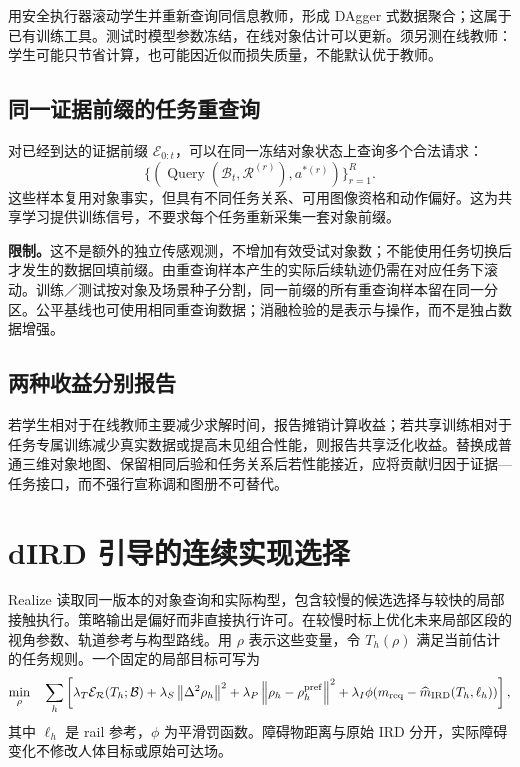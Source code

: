 \documentclass[UTF8,11pt,a4paper,fontset=fandol]{ctexart}
\numberwithin{equation}{section}
\theoremstyle{definition}
\newcommand{\norm}[1]{\left\lVert#1\right\rVert}
\begin{document}
用安全执行器滚动学生并重新查询同信息教师，形成 DAgger 式数据聚合\cite{dagger}；这属于已有训练工具。测试时模型参数冻结，在线对象估计可以更新。须另测在线教师：学生可能只节省计算，也可能因近似而损失质量，不能默认优于教师。

\subsection{同一证据前缀的任务重查询}
对已经到达的证据前缀 $\mathcal E_{0:t}$，可以在同一冻结对象状态上查询多个合法请求：
\begin{equation}
\bigl\{(\operatorname{Query}(\mathcal B_t,\mathcal R^{(r)}),a^{*(r)})\bigr\}_{r=1}^{R}.
\label{eq:requerytraining}
\end{equation}
这些样本复用对象事实，但具有不同任务关系、可用图像资格和动作偏好。这为共享学习提供训练信号，不要求每个任务重新采集一套对象前缀。

\textbf{限制。}这不是额外的独立传感观测，不增加有效受试对象数；不能使用任务切换后才发生的数据回填前缀。由重查询样本产生的实际后续轨迹仍需在对应任务下滚动。训练／测试按对象及场景种子分割，同一前缀的所有重查询样本留在同一分区。公平基线也可使用相同重查询数据；消融检验的是表示与操作，而不是独占数据增强。

\subsection{两种收益分别报告}
若学生相对于在线教师主要减少求解时间，报告摊销计算收益；若共享训练相对于任务专属训练减少真实数据或提高未见组合性能，则报告共享泛化收益。替换成普通三维对象地图、保留相同后验和任务关系后若性能接近，应将贡献归因于证据—任务接口，而不强行宣称调和图册不可替代。

\section{dIRD 引导的连续实现选择}
\label{sec:dird}
Realize 读取同一版本的对象查询和实际构型，包含较慢的候选选择与较快的局部接触执行。策略输出是偏好而非直接执行许可。在较慢时标上优化未来局部区段的视角参数、轨道参考与构型路线。用 $\rho$ 表示这些变量，令 $T_h(\rho)$ 满足当前估计的任务规则。一个固定的局部目标可写为
\begin{equation}
\min_\rho\quad
\sum_h \left[
\lambda_T\mathcal E_{\mathcal R}(T_h;\mathcal B)
+\lambda_S\norm{\Delta^2\rho_h}^2
+\lambda_P\norm{\rho_h-\rho_h^{\rm pref}}^2
+\lambda_I\phi(m_{\rm req}-\widehat m_{\rm IRD}(T_h,\ell_h))
\right],
\label{eq:dirdcost}
\end{equation}
其中 $\ell_h$ 是 rail 参考，$\phi$ 为平滑罚函数。障碍物距离与原始 IRD 分开，实际障碍变化不修改人体目标或原始可达场。
\end{document}
